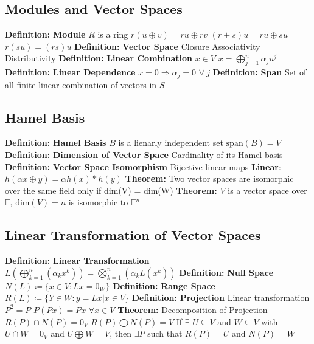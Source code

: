 \documentclass[14pt]{extarticle}
\def\Definition{{\color{blue} \textbf{Definition:} }}
\def\Theorem{{\color{red} \textbf{Theorem:} }}
\begin{document}
\begin{outline}
		\subsection*{Modules and Vector Spaces}
			\1	\Definition \textbf{Module}
				\2	$R$ is a ring
				\2  $r(u \oplus v) = ru \oplus rv$
				\2	$(r + s)u = ru \oplus su$
				\2	$r(su) = (rs)u$
			\1	\Definition \textbf{Vector Space}
				\2	Closure
				\2	Associativity
				\2	Distributivity
			\1	\Definition \textbf{Linear Combination}
				\2	$x \in V$
				\2	$x = \bigoplus_{j=1}^n \alpha_j u^j$
			\1	\Definition \textbf{Linear Dependence}
				\2	$x = 0 \Rightarrow \alpha_j = 0$ $\forall~j$
			\1	\Definition \textbf{Span}
				\2	Set of all finite linear combination of vectors in $S$
		
		\subsection*{Hamel Basis}
			\1	\Definition \textbf{Hamel Basis}
				\2	$B$ is a lienarly independent set
				\2	$\text{span}(B) = V$
			\1	\Definition \textbf{Dimension of Vector Space}
				\2	Cardinality of its Hamel basis
			\1	\Definition \textbf{Vector Space Isomorphism}
				\2	Bijective linear maps
				\2	\textbf{Linear}: $h(\alpha x \oplus y) = \alpha h(x) * h(y)$
			\1	\Theorem Two vector spaces are isomorphic over the same field only if
					dim(V) = dim(W)
			\1	\Theorem $V$ is a vector space over $\mathbb{F}$, $\text{dim}(V) = n$
					is isomorphic to $\mathbb{F}^n$
		
		\subsection*{Linear Transformation of Vector Spaces}
			\1	\Definition \textbf{Linear Transformation}
				\2	$L(\bigoplus_{k=1}^n (\alpha_k x^k)) = \bigotimes_{k=1}^n (\alpha_k L(x^k))$
			\1	\Definition \textbf{Null Space}
				\2	$N(L) \coloneqq \{x \in V : Lx = 0_W\}$
			\1	\Definition \textbf{Range Space}
				\2	$R(L) \coloneqq \{Y \in W : y = Lx | x \in V\}$
			\1	\Definition \textbf{Projection}
				\2	Linear transformation
				\2	$P^2 = P$
				\2	$P(Px) = Px$ $\forall x \in V$
			\1	\Theorem Decomposition of Projection
				\2	$R(P) \cap N(P) = 0_V$
				\2	$R(P) \bigoplus N(P) = V$
				\2	If $\exists$ $U \subseteq V$ and $W \subseteq V$ with $U \cap W = 0_V$
						and $U \bigoplus W = V$, then $\exists P$ such that $R(P) = U$ and
						$N(P) = W$
	\end{outline}
\end{document}
